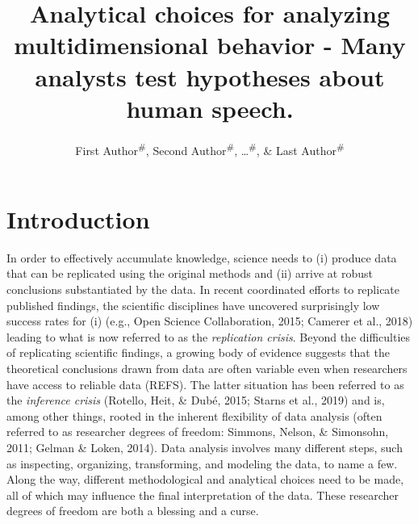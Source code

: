 \documentclass[
  english,
  man,floatsintext]{apa6}
\title{Analytical choices for analyzing multidimensional behavior - Many analysts test hypotheses about human speech.}
\author{First Author\textsuperscript{\#}, Second Author\textsuperscript{\#}, \ldots{}\textsuperscript{\#}, \& Last Author\textsuperscript{\#}}
\date{}
\affiliation{\vspace{0.5cm}\textsuperscript{1} \#\\\textsuperscript{\ldots{}} \ldots{}}
\begin{document}
\maketitle

\hypertarget{introduction}{%
\section{Introduction}\label{introduction}}

In order to effectively accumulate knowledge, science needs to (i) produce data that can be replicated using the original methods and (ii) arrive at robust conclusions substantiated by the data.
In recent coordinated efforts to replicate published findings, the scientific disciplines have uncovered surprisingly low success rates for (i) (e.g., Open Science Collaboration, 2015; Camerer et al., 2018) leading to what is now referred to as the \emph{replication crisis}.
Beyond the difficulties of replicating scientific findings, a growing body of evidence suggests that the theoretical conclusions drawn from data are often variable even when researchers have access to reliable data (REFS).
The latter situation has been referred to as the \emph{inference crisis} (Rotello, Heit, \& Dubé, 2015; Starns et al., 2019) and is, among other things, rooted in the inherent flexibility of data analysis (often referred to as researcher degrees of freedom: Simmons, Nelson, \& Simonsohn, 2011; Gelman \& Loken, 2014).
Data analysis involves many different steps, such as inspecting, organizing, transforming, and modeling the data, to name a few.
Along the way, different methodological and analytical choices need to be made, all of which may influence the final interpretation of the data.
These researcher degrees of freedom are both a blessing and a curse.
\end{document}
